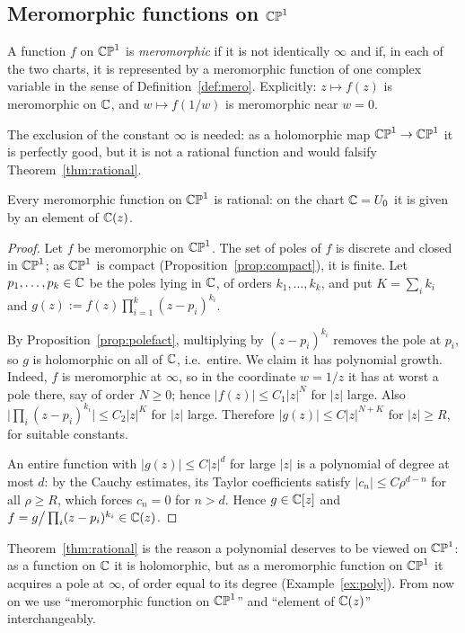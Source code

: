 \subsection{Meromorphic functions on $\mathbb{CP}^1$}

\begin{definition}\label{def:meroPP}
A function $f$ on $\mathbb{CP}^1$ is \emph{meromorphic} if it is not identically $\infty$
and if, in each of the two charts, it is represented by a meromorphic function of
one complex variable in the sense of Definition~\ref{def:mero}. Explicitly: $z
\mapsto f(z)$ is meromorphic on $\mathbb{C}$, and $w \mapsto f(1/w)$ is meromorphic near
$w = 0$.
\end{definition}

\begin{remark}
The exclusion of the constant $\infty$ is needed: as a holomorphic map $\mathbb{CP}^1 \to
\mathbb{CP}^1$ it is perfectly good, but it is not a rational function and would falsify
Theorem~\ref{thm:rational}.
\end{remark}

\begin{theorem}\label{thm:rational}
Every meromorphic function on $\mathbb{CP}^1$ is rational: on the chart $\mathbb{C} = U_0$ it is
given by an element of $\mathbb{C}(z)$.
\end{theorem}

\begin{proof}
Let $f$ be meromorphic on $\mathbb{CP}^1$. The set of poles of $f$ is discrete and closed
in $\mathbb{CP}^1$; as $\mathbb{CP}^1$ is compact (Proposition~\ref{prop:compact}), it is finite.
Let $p_1, \dots, p_k \in \mathbb{C}$ be the poles lying in $\mathbb{C}$, of orders
$k_1, \dots, k_k$, and put $K = \sum_i k_i$ and
$g(z) := f(z)\prod_{i=1}^{k}(z-p_i)^{k_i}$.

By Proposition~\ref{prop:polefact}, multiplying by $(z-p_i)^{k_i}$ removes the
pole at $p_i$, so $g$ is holomorphic on all of $\mathbb{C}$, i.e.\ entire. We claim it
has polynomial growth. Indeed, $f$ is meromorphic at $\infty$, so in the
coordinate $w = 1/z$ it has at worst a pole there, say of order $N \geq 0$; hence
$|f(z)| \leq C_1 |z|^{N}$ for $|z|$ large. Also
$\big|\prod_i (z-p_i)^{k_i}\big| \leq C_2|z|^{K}$ for $|z|$ large. Therefore
$|g(z)| \leq C |z|^{N+K}$ for $|z| \geq R$, for suitable constants.

An entire function with $|g(z)| \leq C|z|^{d}$ for large $|z|$ is a polynomial of
degree at most $d$: by the Cauchy estimates, its Taylor coefficients satisfy
$|c_n| \leq C \rho^{d-n}$ for all $\rho \geq R$, which forces $c_n = 0$ for
$n > d$. Hence $g \in \mathbb{C}[z]$ and
$f = g \big/ \prod_i (z-p_i)^{k_i} \in \mathbb{C}(z)$.
\end{proof}

\begin{remark}
Theorem~\ref{thm:rational} is the reason a polynomial deserves to be viewed on
$\mathbb{CP}^1$: as a function on $\mathbb{C}$ it is holomorphic, but as a meromorphic function on
$\mathbb{CP}^1$ it acquires a pole at $\infty$, of order equal to its degree
(Example~\ref{ex:poly}). From now on we use ``meromorphic function on $\mathbb{CP}^1$'' and
``element of $\mathbb{C}(z)$'' interchangeably.
\end{remark}

